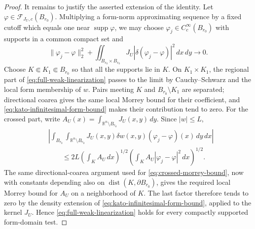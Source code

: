 \documentclass[10pt,a4paper]{amsart}
\newcommand{\R}{\mathbb R}
\newcommand{\dd}{\,d}
\begin{document}
\begin{proof}
It remains to justify the asserted extension of the identity.  Let
\(\varphi\in\mathcal F_{J_U,c}(B_{r_0})\).  Multiplying a form-norm
approximating sequence by a fixed cutoff which equals one near
\(\operatorname{supp}\varphi\), we may choose
\(\varphi_j\in C_c^\infty(B_{r_0})\) with supports in a common compact
set and
\[
 \|\varphi_j-\varphi\|_2^2
 +\iint_{B_{r_0}\times B_{r_0}}J_U
       |\delta(\varphi_j-\varphi)|^2\dd x\!\dd y\longrightarrow0.
\]
Choose \(K\Subset K_1\Subset B_{r_0}\) so that all the supports lie in
\(K\).  On \(K_1\times K_1\), the regional part of
\eqref{eq:full-weak-linearization} passes to the limit by
Cauchy--Schwarz and the local form membership of \(w\).  Pairs meeting
\(K\) and \(B_{r_0}\setminus K_1\) are separated; directional coarea
gives the same local Morrey bound for their coefficient, and
\eqref{eq:kato-infinitesimal-form-bound} makes their contribution tend
to zero.  For the crossed part, write
\(A_U(x)=\int_{\R^n\setminus B_{r_0}}
J_U(x,y)\dd y\).  Since \(|w|\le L\),
\begin{align*}
 &\left|\int_{B_{r_0}}\int_{\R^n\setminus B_{r_0}}
 J_U(x,y)\delta w(x,y)(\varphi_j-\varphi)(x)\dd y\!\dd x\right|\\
 &\qquad\le2L
 \left(\int_KA_U\dd x\right)^{1/2}
 \left(\int_KA_U|\varphi_j-\varphi|^2\dd x\right)^{1/2}.
\end{align*}
The same
directional-coarea argument used for \eqref{eq:crossed-morrey-bound},
now with constants depending also on
\(\operatorname{dist}(K,\partial B_{r_0})\), gives the required local
Morrey bound for \(A_U\) on a neighborhood of \(K\).  The last factor
therefore tends to zero by the density extension of
\eqref{eq:kato-infinitesimal-form-bound}, applied to the kernel
\(J_U\).  Hence
\eqref{eq:full-weak-linearization} holds for every compactly supported
form-domain test.
\end{proof}
\end{document}
